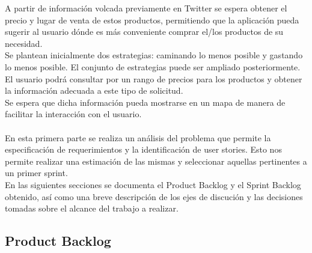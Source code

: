 \documentclass[a4paper,8pt]{article}
\begin{document}
A partir de información volcada previamente en Twitter se espera obtener el precio y lugar de venta de estos productos, permitiendo que la aplicación pueda sugerir al usuario dónde es más conveniente comprar el/los productos de su necesidad.\\

Se plantean inicialmente dos estrategias: caminando lo menos posible y gastando lo menos posible. El conjunto de estrategias puede ser ampliado posteriormente.\\
El usuario podrá consultar por un rango de precios para los productos y obtener la información adecuada a este tipo de solicitud. \\

Se espera que dicha información pueda mostrarse en un mapa de manera de facilitar la interacción con el usuario.\\\\

En esta primera parte se realiza un análisis del problema que permite la especificación de requerimientos y la identificación de user stories. Esto nos permite realizar una estimación de las mismas y seleccionar aquellas pertinentes a un primer sprint.\\

En las siguientes secciones se documenta el Product Backlog y el Sprint Backlog obtenido, así como una breve descripción de los ejes de discución y las decisiones tomadas sobre el alcance del trabajo a realizar.\\



\newpage
\subsection{Product Backlog}
\end{document}
